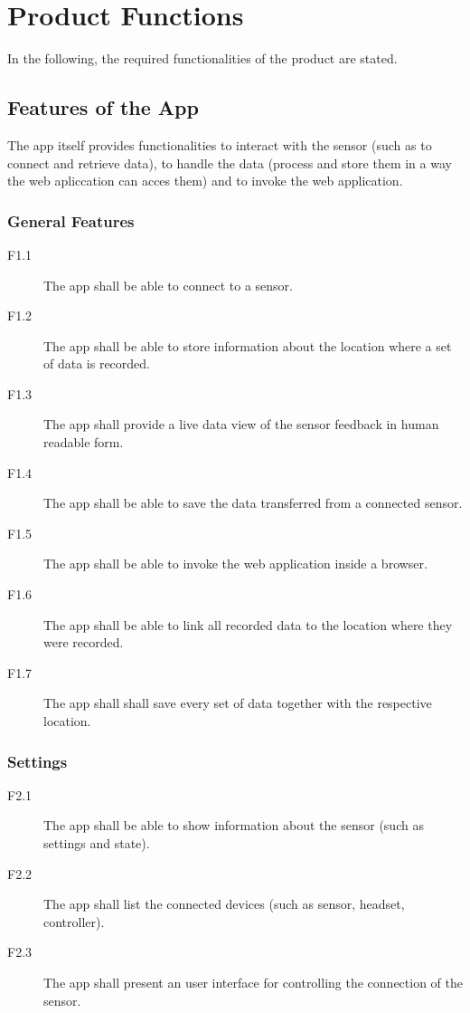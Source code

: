 \section{Product Functions}

In the following, the required functionalities of the product are stated.

\subsection{Features of the App}

The app itself provides functionalities to interact with the sensor (such as to connect and retrieve data), to handle the data (process and store them in a way the web apliccation can acces them) and to invoke the web application.

\subsubsection{General Features}

\begin{description}
  \item[F1.1] The app shall be able to connect to a sensor.
  \item[F1.2] The app shall be able to store information about the location where a set of data is recorded.
  \item[F1.3] The app shall provide a live data view of the sensor feedback in human readable form.
  \item[F1.4] The app shall be able to save the data transferred from a connected sensor.
  \item[F1.5] The app shall be able to invoke the web application inside a browser.
  \item[F1.6] The app shall be able to link all recorded data to the location where they were recorded.
  \item[F1.7] The app shall shall save every set of data together with the respective location.
\end{description}

\subsubsection{Settings}

\begin{description}
      \item[F2.1] The app shall be able to show information about the sensor (such as settings and state).
      \item[F2.2] The app shall list the connected devices (such as sensor, headset, controller). 
      \item[F2.3] The app shall present an user interface for controlling the connection of the sensor. 
    \end{description}

